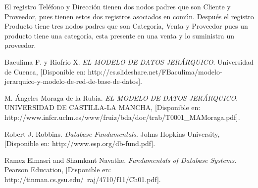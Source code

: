 \documentclass[spanish,12pt,letterpapper]{article}
\begin{document}
	El registro Teléfono y Dirección tienen dos nodos padres que son Cliente y Proveedor, pues tienen estos dos registros asociados en común. Después el registro Producto tiene tres nodos padres que son Categoría, Venta y Proveedor pues un producto tiene una categoría, esta presente en una venta y lo suministra un proveedor.
	
	
	\pagebreak
	\begin{thebibliography}{9}
	
	 Baculima F. y Riofrio X. 
		\emph{EL MODELO DE DATOS JERÁRQUICO}. Universidad de Cuenca, [Disponible en: http://es.slideshare.net/FBaculima/modelo-jerarquico-y-modelo-de-red-de-base-de-datos].	

 M. Ángeles Moraga de la Rubia. 
		\emph{EL MODELO DE DATOS JERÁRQUICO}. UNIVERSIDAD DE CASTILLA-LA MANCHA, [Disponible en: http://www.infcr.uclm.es/www/fruiz/bda/doc/trab/T0001\_MAMoraga.pdf].	
			
		 Robert J. Robbins. 
		\emph{Database Fundamentals}. Johns Hopkins University, [Disponible en: http://www.esp.org/db-fund.pdf].
		
		 Ramez Elmasri and Shamkant Navathe. 
		\emph{Fundamentals of Database Systems}. Pearson Education, [Disponible en: http://tinman.cs.gsu.edu/~raj/4710/f11/Ch01.pdf].

	\end{thebibliography}
\end{document}
